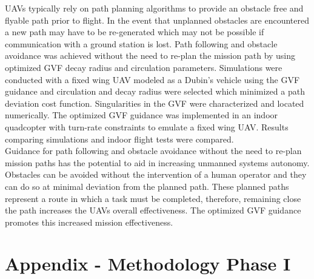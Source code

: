 \documentclass[numbered,pdftex]{ohio-etd}
\begin{document}
UAVs typically rely on path planning algorithms to provide an obstacle free and flyable path prior to flight. In the event that unplanned obstacles are encountered a new path may have to be re-generated which may not be possible if communication with a ground station is lost. Path following and obstacle avoidance was achieved without the need to re-plan the mission path by using optimized GVF decay radius and circulation parameters. Simulations were conducted with a fixed wing UAV modeled as a Dubin's vehicle using the GVF guidance and circulation and decay radius were selected which minimized a path deviation cost function. Singularities in the GVF were characterized and located numerically. The optimized GVF guidance was implemented in an indoor quadcopter with turn-rate constraints to emulate a fixed wing UAV. Results comparing simulations and indoor flight tests were compared. \\

Guidance for path following and obstacle avoidance without the need to re-plan mission paths has the potential to aid in increasing unmanned systems autonomy. Obstacles can be avoided without the intervention of a human operator and they can do so at minimal deviation from the planned path. These planned paths represent a route in which a task must be completed, therefore, remaining close the path increases the UAVs overall effectiveness. The optimized GVF guidance promotes this increased mission effectiveness. 



\chapter{Appendix - Methodology Phase I}
\end{document}
